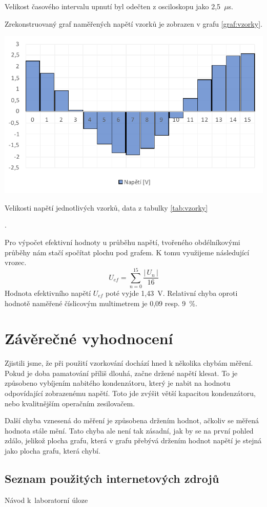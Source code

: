 \documentclass[a4paper,12pt]{article}   %
\newcommand{\tmu}{$\mu$}
\begin{document}
Velikost časového intervalu upnutí byl odečten z osciloskopu jako 2,5~\tmu s.

Zrekonstruovaný graf naměřených napětí vzorků je zobrazen v grafu \ref{graf:vzorky}.

\begin{graf}
  \centering
  \includegraphics[width=.8\textwidth]{graf_vzorky.pdf}
  \caption{Velikosti napětí jednotlivých vzorků, data z tabulky \ref{tab:vzorky}}
  \label{graf:vzorky}
\end{graf}.

Pro výpočet efektivní hodnoty u průběhu napětí, tvořeného obdélníkovými průběhy nám stačí spočítat plochu pod grafem. K tomu využijeme následující vrozec.
\begin{equation}
  U_{ef} = \sum_{n=0}^{15} \frac{|\,U_n\,|}{16}
\end{equation}
Hodnota efektivního napětí $U_{ef}$ poté vyjde 1,43~V. Relativní chyba oproti hodnotě naměřené číslicovým multimetrem je 0,09 resp. 9~\%.


\section{Závěrečné vyhodnocení}
\label{chap:zaver}
Zjistili jsme, že při použití vzorkování dochází hned k několika chybám měření. Pokud je doba pamatování příliš dlouhá, začne držené napětí klesat. To je způsobeno vybíjením nabitého kondenzátoru, který je nabit na hodnotu odpovídající zobrazenému napětí. Toto jde zvýšit větší kapacitou kondenzátoru, nebo kvalitnějším operačním zesilovačem.

Další chyba vznesená do měření je způsobena držením hodnot, ačkoliv se měřená hodnota stále mění. Tato chyba ale není tak zásadní, jak by se na první pohled zdálo, jelikož plocha grafu, která v grafu přebývá držením hodnot napětí je stejná jako plocha grafu, která chybí.


\clearpage
\renewcommand{\refname}{Seznam použité literatury a~zdrojů informací} 

\begin{thebibliography}{99}

\subsection*{Seznam použitých internetových zdrojů}
     Návod k~laboratorní úloze
    
\end{thebibliography}
\end{document}
